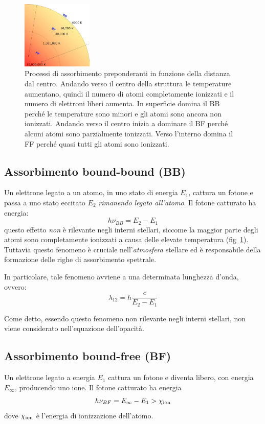 \begin{figure}
\centering
\includegraphics[width=0.3\textwidth]{immagini/assorbimenti-stella.jpg}
\caption{Processi di assorbimento preponderanti in funzione della distanza dal centro. Andando verso il centro della struttura le temperature aumentano, quindi il numero di atomi completamente ionizzati e il numero di elettroni liberi aumenta. In superficie domina il BB perché le temperature sono minori e gli atomi sono ancora non ionizzati. Andando verso il centro inizia a dominare il BF perché alcuni atomi sono parzialmente ionizzati. Verso l'interno domina il FF perché quasi tutti gli atomi sono ionizzati.}
\label{fig:assorbimenti-stella}
\end{figure}

\subsection{Assorbimento bound-bound (BB)}\label{sec:bound-bound}
Un elettrone legato a un atomo, in uno stato di energia $E_1$, cattura un fotone e passa a uno stato eccitato $E_2$ \emph{rimanendo legato all'atomo}. Il fotone catturato ha energia:
\begin{equation}
    h \nu_{BB} = E_2 - E_1
\end{equation}
questo effetto \emph{non} è rilevante negli interni stellari, siccome la maggior parte degli atomi sono completamente ionizzati a causa delle elevate temperatura (fig~\ref{fig:assorbimenti-stella}). Tuttavia questo fenomeno è cruciale nell'\emph{atmosfera} stellare ed è responsabile della formazione delle righe di assorbimento spettrale.

In particolare, tale fenomeno avviene a una determinata lunghezza d'onda, ovvero:
\begin{equation}\label{eq:lunghezza-BB}
    \lambda_{12} = h \dfrac{c}{E_2 - E_1}
\end{equation}

Come detto, essendo questo fenomeno non rilevante negli interni stellari, non viene considerato nell'equazione dell'opacità.

\subsection{Assorbimento bound-free (BF)}\label{sec:bound-free}
Un elettrone legato a energia $E_1$ cattura un fotone e diventa libero, con energia $E_\infty$, producendo uno ione. Il fotone catturato ha energia
\begin{equation}
    h \nu_{BF} = E_\infty - E_1 > \chi_\textup{ion}
\end{equation}
dove $\chi_\textup{ion}$ è l'energia di ionizzazione dell'atomo. 

